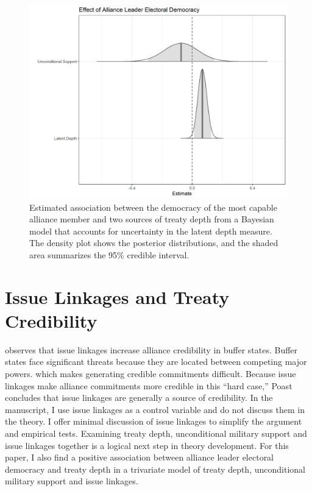 \documentclass[12pt]{article}
\begin{document}
\begin{figure}
\includegraphics[width=.95\textwidth]{results-unc-depth.png}  
\caption{Estimated association between the democracy of the most capable alliance member and two sources of treaty depth from a Bayesian model that accounts for uncertainty in the latent depth measure. The density plot shows the posterior distributions, and the shaded area summarizes the 95\% credible interval.}
\label{fig:results-unc-depth}
\end{figure}




\section{Issue Linkages and Treaty Credibility}


\citep{Poast2013} observes that issue linkages increase alliance credibility in buffer states.
Buffer states face significant threats because they are located between competing major powers. which makes generating credible commitments difficult.
Because issue linkages make alliance commitments more credible in this ``hard case,'' Poast concludes that issue linkages are generally a source of credibility.
In the manuscript, I use issue linkages as a control variable and do not discuss them in the theory. 
I offer minimal discussion of issue linkages to simplify the argument and empirical tests. 
Examining treaty depth, unconditional military support and issue linkages together is a logical next step in theory development. 
For this paper, I also find a positive association between alliance leader electoral democracy and treaty depth in a trivariate model of treaty depth, unconditional military support and issue linkages. 
\end{document}

